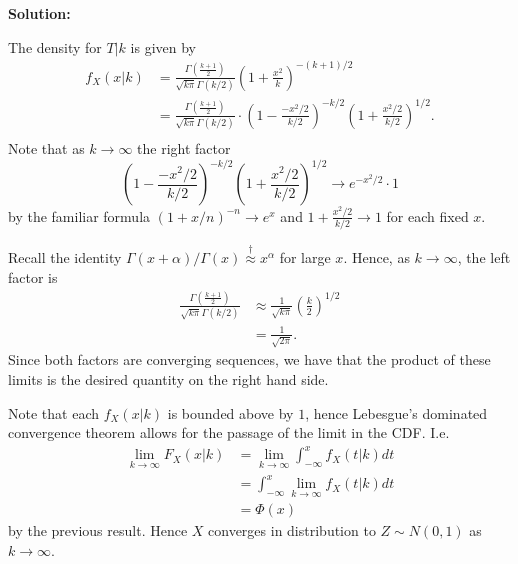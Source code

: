 \documentclass{homework}
\begin{document}
  {\bf Solution:}

  The density for $T|k$ is given by 
    \begin{align*} 
    f_X(x|k) &= \frac{\Gamma\left(\frac{k+1}2\right)}{\sqrt{k\pi} \Gamma(k/2)}\left(1 + \frac{x^2}k\right)^{-(k+1)/2} \\
             &= \frac{\Gamma\left(\frac{k+1}2\right)}{\sqrt{k\pi} \Gamma(k/2)} \cdot \left(1 - \frac{-x^2/2}{k/2}\right)^{-k/2}\left(1 + \frac{x^2/2}{k/2}\right)^{1/2}. \\
  \end{align*}
  Note that as $k\to \infty$ the right factor
  $$
  \left(1 - \frac{-x^2/2}{k/2}\right)^{-k/2}\left(1 + \frac{x^2/2}{k/2}\right)^{1/2} \longrightarrow e^{-x^2/2} \cdot 1
  $$
  by the familiar formula $(1+x/n)^{-n} \to e^x$ and $1 + \frac{x^2/2}{k/2} \to 1$ for each fixed $x$.  
  
  Recall the identity $\Gamma(x + \alpha)/\Gamma(x) \stackrel{\dagger}\approx x^\alpha$ for large $x$.  Hence, as $k\to\infty$, the left factor is
  \begin{align*}
    \frac{\Gamma\left(\frac{k+1}2\right)}{\sqrt{k\pi} \Gamma(k/2)} &\approx \frac1{\sqrt{k\pi}} \left(\frac k2\right)^{1/2}\\
    &=\frac 1{\sqrt{2\pi}}.
  \end{align*}
  Since both factors are converging sequences, we have that the product of these limits is the desired quantity on the right hand side. 

  Note that each $f_X(x|k)$ is bounded above by $1$, hence Lebesgue's dominated convergence theorem allows for the passage of the limit in the CDF. I.e.
  \begin{align*}
  \lim_{k\to \infty} F_X(x|k) 
  &= \lim_{k\to \infty} \int_{-\infty}^x f_X(t|k)dt \\
  &= \int_{-\infty}^x \lim_{k\to \infty} f_X(t|k)dt \\
  &= \Phi(x)
  \end{align*}
  by the previous result.  Hence $X$ converges in distribution to $Z\sim N(0,1)$ as $k \to \infty$.
  
\end{document}
